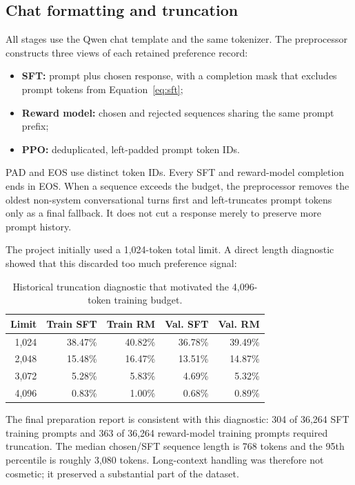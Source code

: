\documentclass[11pt]{article}
\begin{document}
\subsection{Chat formatting and truncation}

All stages use the Qwen chat template and the same tokenizer. The preprocessor
constructs three views of each retained preference record:

\begin{itemize}
  \item \textbf{SFT:} prompt plus chosen response, with a completion mask that
  excludes prompt tokens from Equation~\ref{eq:sft};
  \item \textbf{Reward model:} chosen and rejected sequences sharing the same
  prompt prefix;
  \item \textbf{PPO:} deduplicated, left-padded prompt token IDs.
\end{itemize}

PAD and EOS use distinct token IDs. Every SFT and reward-model completion ends
in EOS. When a sequence exceeds the budget, the preprocessor removes the
oldest non-system conversational turns first and left-truncates prompt tokens
only as a final fallback. It does not cut a response merely to preserve more
prompt history.

The project initially used a 1,024-token total limit. A direct length
diagnostic showed that this discarded too much preference signal:

\begin{table}[H]
\centering
\caption{Historical truncation diagnostic that motivated the 4,096-token
training budget.}
\label{tab:length-diagnostic}
\begin{tabular}{@{}rrrrr@{}}
\toprule
\textbf{Limit} &
\textbf{Train SFT} &
\textbf{Train RM} &
\textbf{Val. SFT} &
\textbf{Val. RM}\\
\midrule
1,024 & 38.47\% & 40.82\% & 36.78\% & 39.49\%\\
2,048 & 15.48\% & 16.47\% & 13.51\% & 14.87\%\\
3,072 & 5.28\% & 5.83\% & 4.69\% & 5.32\%\\
4,096 & 0.83\% & 1.00\% & 0.68\% & 0.89\%\\
\bottomrule
\end{tabular}
\end{table}

The final preparation report is consistent with this diagnostic: 304 of
36,264 SFT training prompts and 363 of 36,264 reward-model training prompts
required truncation. The median chosen/SFT sequence length is 768 tokens and
the 95th percentile is roughly 3,080 tokens. Long-context handling was
therefore not cosmetic; it preserved a substantial part of the dataset.
\end{document}
